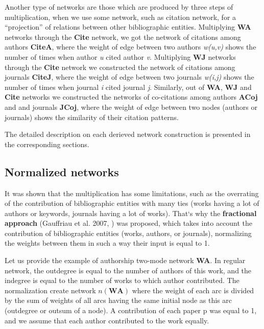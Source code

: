 \documentclass[11pt]{article} %
\begin{document}
Another type of networks are those which are produced by three steps of multiplication, when we use some network, such as citation network, for a ``projection'' of relations between other bibliographic entities. Multiplying \textbf{WA} networks through the \textbf{Cite} network, we got the network of citations among authors \textbf{CiteA}, where the weight of edge between two authors \textit{w(u,v)} shows the number of times when author \textit{u} cited author \textit{v}. Multiplying \textbf{WJ} networks through the \textbf{Cite} network we constructed the network of citations among journals \textbf{CiteJ}, where the weight of edge between two journals \textit{w(i,j)} shows the number of times when journal \textit{i} cited journal \textit{j}. Similarly, out of \textbf{WA}, \textbf{WJ} and \textbf{Cite} networks we constructed the networks of co-citations among authors \textbf{ACoj} and and journals \textbf{JCoj}, where the weight of edge between two nodes (authors or journals) shows the similarity of their citation patterns.\medskip 

The detailed description on each derieved network construction is presented in the corresponding sections. \medskip 

\subsection{Normalized networks} 

It was shown that the multiplication has some limitations, such as the overrating of the contribution of bibliographic entities with many ties (works having a lot of authors or keywords, journals having a lot of works). That`s why the \textbf{fractional approach} (Gauffriau et al. 2007, \cite{OnBibl}) was proposed, which takes into account the contribution of bibliographic entities (works, authors, or journals), normalizing the weights between them in such a way their input is equal to 1. \medskip 

Let us provide the example of authorship two-mode network \textbf{WA}. In regular network, the outdegree is equal to the number of authors of this work, and the indegree is equal to the number of works to which author contributed. The normalization create network $n(\textbf{WA})$ where the weight of each arc is divided by the sum of weights of all arcs having the same initial node as this arc (outdegree or outsum of a node). A contribution of each paper p was equal to 1, and we assume that each author contributed to the work equally. \smallskip 
\end{document}

